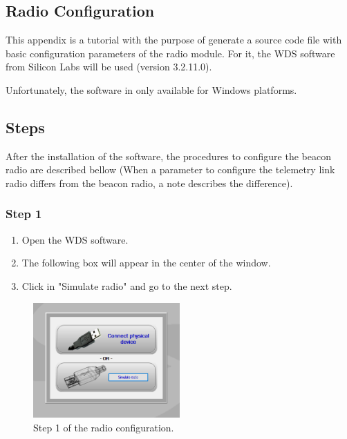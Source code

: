 \documentclass[12pt]{book}
\begin{document}

\begin{appendices}

\chapter{Radio Configuration}

This appendix is a tutorial with the purpose of generate a source code file with basic configuration parameters of the radio module. For it, the WDS software from Silicon Labs will be used (version 3.2.11.0).

Unfortunately, the software in only available for Windows platforms.

\section{Steps}

After the installation of the software, the procedures to configure the beacon radio are described bellow (When a parameter to configure the telemetry link radio differs from the beacon radio, a note describes the difference).

\subsection{Step 1}

\begin{enumerate}
    \item Open the WDS software.
    \item The following box will appear in the center of the window.
    \item Click in "Simulate radio" and go to the next step.
\end{enumerate}

\begin{figure}[!h]
	\begin{center}
		\includegraphics[width=0.5\textwidth]{figures/wds-tutorial-1.png}
		\caption{Step 1 of the radio configuration.}
		\label{fig:wds-tutorial-step-1}
	\end{center}
\end{figure}


\end{appendices}
\end{document}
